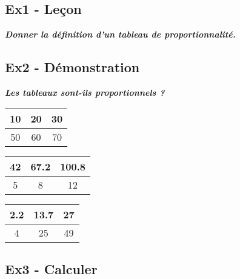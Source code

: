 \documentclass[12pt]{article}
\newcommand{\Pointilles}[1][3]{%
  \multido{}{#1}{\makebox[\linewidth]{\dotfill}\\[\parskip]
}}
\begin{document}
\subsection*{Ex1 - Leçon}

\textit{\textbf{Donner la définition d'un tableau de proportionnalité.}}

\Pointilles[4]

\subsection*{Ex2 - Démonstration}

\textit{\textbf{Les tableaux sont-ils proportionnels ?}}

\begin{multicols}{3}

  \begin{center}
      \begin{tabular}{|c|c|c|}
        \hline
        10 & 20 & 30 \\  \hline
        50 & 60 & 70 \\  \hline
      \end{tabular}
    \end{center}

    \Pointilles[6]

    \begin{center}
      \begin{tabular}{|c|c|c|}
        \hline
        42 & 67.2 & 100.8 \\  \hline
         5 &    8 &    12 \\  \hline
      \end{tabular}
    \end{center}

    \Pointilles[6]

    \begin{center}
      \begin{tabular}{|c|c|c|}
        \hline
        2.2 & 13.7 & 27 \\  \hline
          4 &   25 & 49 \\  \hline
      \end{tabular}
    \end{center}    

    \Pointilles[6]

  \end{multicols}

\subsection*{Ex3 - Calculer}
\end{document}
